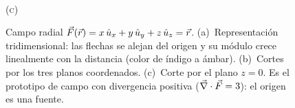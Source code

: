 \begin{figure}[ht]
\begin{minipage}[t]{0.325\textwidth}
\\[2pt]{\small\scshape (c)}
\end{minipage}
\caption{Campo radial $\vec{F}(\vec{r})=x\,\hat{u}_{x}+y\,\hat{u}_{y}+z\,\hat{u}_{z}=\vec{r}$.
(a)~Representación tridimensional: las flechas se alejan del origen y su
módulo crece linealmente con la distancia (color de índigo a ámbar).
(b)~Cortes por los tres planos coordenados. (c)~Corte por el plano $z=0$.
Es el prototipo de campo con divergencia positiva ($\vec{\nabla}\cdot\vec{F}=3$):
el origen es una fuente.}
\label{fig:radial}
\end{figure}
